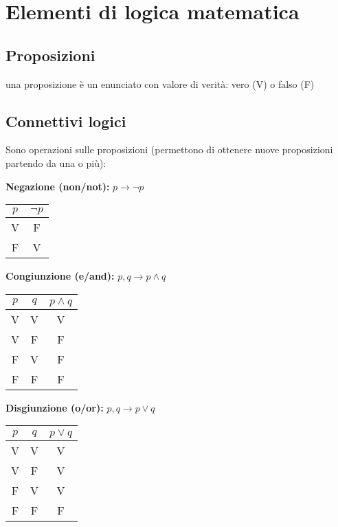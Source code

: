 \documentclass[10pt]{article}
\theoremstyle{plain}
\begin{document}
\section{Elementi di logica matematica}
\subsection*{Proposizioni}
\begin{defin}una proposizione è un enunciato con valore di verità: vero (V) o falso (F)
\end{defin}
\subsection{Connettivi logici}
Sono operazioni sulle proposizioni (permettono di ottenere nuove proposizioni partendo da una o più):
\begin{description}
   \item[$\ast$] \textbf{Negazione (non/not):} $p \longrightarrow \neg p$ 
   \item \begin{center} \begin{tabular}{c|c}
        $p$ & $\neg p$  \\
        \hline  V  & F \\ F & V
       \end{tabular} \end{center}
     \item[$\ast$] \textbf{Congiunzione (e/and):} $p, q \longrightarrow p \land q$
   \item \begin{center} \begin{tabular}{c|c|c}
        $p$ & $q$ & $p \land q$  \\
        \hline  V  & V & V \\ V & F & F \\ F & V & F \\ F & F & F 
       \end{tabular}
       \end{center}
 \item[$\ast$] \textbf{Disgiunzione (o/or):} $p, q \longrightarrow p \lor q$
   \item \begin{center} \begin{tabular}{c|c|c}
        $p$ & $q$ & $p \lor q$  \\
        \hline  V  & V & V \\ V & F & V \\ F & V & V \\ F & F & F

\end{tabular}
\end{center}
\end{description}
\end{document}
